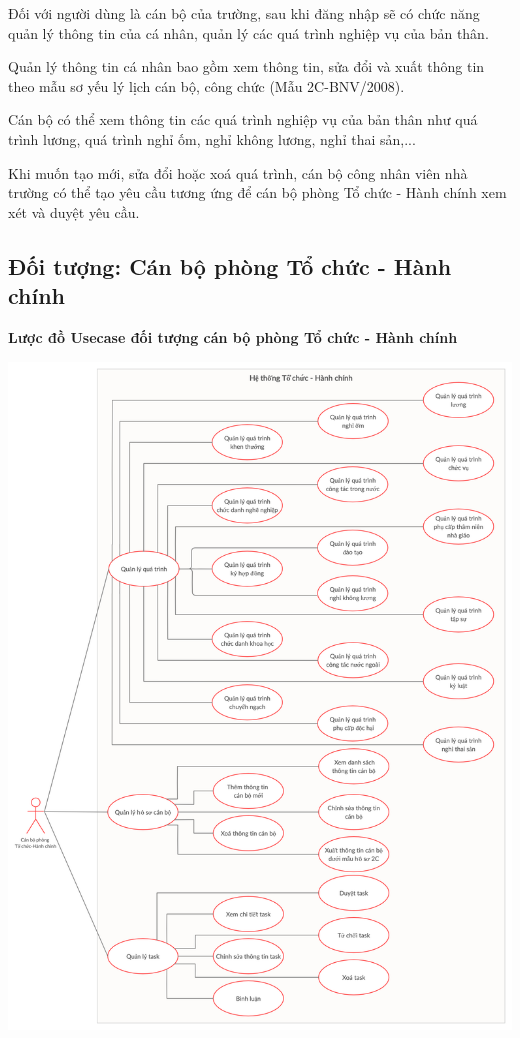 Đối với người dùng là cán bộ của trường, sau khi đăng nhập sẽ có chức năng quản lý thông tin của cá nhân, quản lý các quá trình nghiệp vụ của bản thân.

Quản lý thông tin cá nhân bao gồm xem thông tin, sửa đổi và xuất thông tin theo mẫu sơ yếu lý lịch cán bộ, công chức (Mẫu 2C-BNV/2008).

Cán bộ có thể xem thông tin các quá trình nghiệp vụ của bản thân như quá trình lương, quá trình nghỉ ốm, nghỉ không lương, nghỉ thai sản,... 

Khi muốn tạo mới, sửa đổi hoặc xoá quá trình, cán bộ công nhân viên nhà trường có thể tạo yêu cầu tương ứng để cán bộ phòng Tổ chức - Hành chính xem xét và duyệt yêu cầu.

\subsection{Đối tượng: Cán bộ phòng Tổ chức - Hành chính}
\textbf{Lược đồ Usecase đối tượng cán bộ phòng Tổ chức - Hành chính}
\begin{center}
  \captionsetup{type=figure}
  \includegraphics[width=15cm]{img/usecase/nhanVienTCHC.png}
\end{center}

